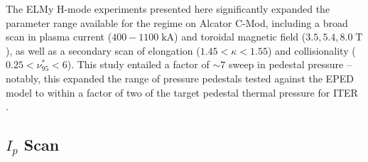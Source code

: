 The ELMy H-mode experiments presented here significantly expanded the parameter range available for the regime on Alcator C-Mod, including a broad scan in plasma current ($400-1100\;\si{\kilo\ampere}$) and toroidal magnetic field ($3.5, 5.4, 8.0\;\si{\tesla}$), as well as a secondary scan of elongation ($1.45 < \kappa < 1.55$) and collisionality ($0.25 < \nu_{95}^* < 6$).  This study entailed a factor of $\sim 7$ sweep in pedestal pressure -- notably, this expanded the range of pressure pedestals tested against the EPED model to within a factor of two of the target pedestal thermal pressure for ITER \cite{Snyder2011}.

\subsection{$I_p$ Scan}\label{subsec:elmy_ip}


